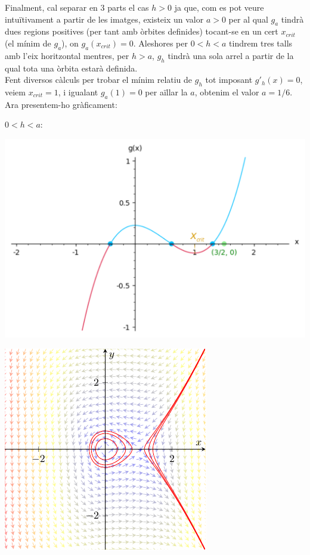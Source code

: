 \documentclass[10pt,a4paper]{article}
\begin{document}
Finalment, cal separar en 3 parts el cas $h>0$ ja que, com es pot veure intuïtivament a partir de les imatges, existeix un valor $a>0$ per al qual $g_a$ tindrà dues regions positives (per tant amb òrbites definides) tocant-se en un cert $x_{crit}$ (el mínim de $g_a$), on $g_a(x_{crit})=0$. Aleshores per	$0<h<a$ tindrem tres talls amb l'eix horitzontal mentres, per $h>a$, $g_h$ tindrà una sola arrel a partir de la qual tota una òrbita estarà definida.
\\Fent diversos càlculs per trobar el mínim relatiu de $g_h$ tot imposant $g'_h(x)=0$, veiem $x_{crit}=1$, i igualant $g_a(1)=0$ per aïllar la $a$, obtenim el valor $\boxed{a=1/6}$. Ara presentem-ho gràficament:

\pagebreak
\underline{$0<h<a$}:
\begin{center}
  \begin{minipage}[h]{0.57\textwidth}\hspace{3mm}
    \includegraphics[scale=0.4]{Images/gh=1i9}
    \label{gh=1i9}
  \end{minipage}\hfill
  \begin{minipage}[h]{0.43\textwidth}
    \includegraphics[scale=1.1]{Images/retrat2h1i9}
    \label{retrat1i9}
  \end{minipage}
\end{center}
\end{document}
